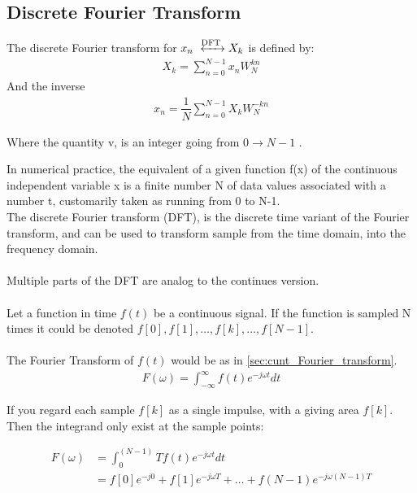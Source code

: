 \subsection{Discrete Fourier Transform}
The discrete Fourier transform for $x_n \xleftrightarrow{\text{DFT}} X_k$ is defined by:
\begin{align*}
	X_k = \sum_{n=0}^{N-1} x_n W_N^{kn}
\end{align*}
And the inverse
\begin{align*}
	x_n = \dfrac{1}{N} \sum_{n=0}^{N-1}X_k W_{N}^{-kn}
\end{align*}

Where the quantity v, is an integer going from $0 \to N-1$
.


In numerical practice, the equivalent of a given function f(x) of the continuous independent variable x is a finite number N of data values associated with a number t, customarily taken as running from 0 to N-1.
\\
The discrete Fourier transform (DFT), is the discrete time variant of the Fourier transform, and can be used to transform sample from the time domain, into the frequency domain.
\\\\
Multiple parts of the DFT are analog to the continues version.
\\\\
Let a function in time $f(t)$ be a continuous signal.
If the function is sampled N times it could be denoted
$f[0],f[1],\dots,f[k],\dots,f[N-1]$.
\\\\
The Fourier Transform of $f(t)$ would be as in \ref{sec:cunt_Fourier_transform}. 
\begin{align*}
	F(\omega) = \int_{-\infty}^\infty f(t)e^{-j\omega t} dt
\end{align*}

If you regard each sample $f[k]$ as a single impulse, with a giving area $f[k]$. Then the integrand only exist at the sample points:

\begin{align*}
	F(\omega) 
	&= \int_0^{(N-1)}T f(t) e^{-j\omega t}dt\\
	&= f[0]e^{-j0} + f[1]e^{-j\omega T} + \dots + f(N-1) e^{-j\omega(N-1)T}	
\end{align*}

